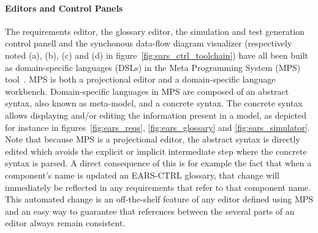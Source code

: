 \paragraph{\textbf{Editors and Control Panels}\\} 
\hspace{-.2cm}
The requirements editor, the glossary editor, the simulation and
test generation control panell and the synchonous data-flow diagram visualizer (respectively
noted (\textsf{a}), (\textsf{b}), (\textsf{c}) and (\textsf{d}) in figure~\ref{fig:ears_ctrl_toolchain}) have all been built as 
domain-specific languages (DSLs) in the Meta Programming System (MPS)
tool~\cite{mps}.
MPS is both a projectional editor and a domain-specific language workbench.
Domain-specific languages in MPS are composed of an abstract syntax, also known
as meta-model, and a concrete syntax. The concrete syntax allows displaying
and/or editing the information present in a model, as depicted for instance in
figures~\ref{fig:ears_reqs}, \ref{fig:ears_glossary} and
\ref{fig:ears_simulator}. Note that because MPS is a projectional editor, the
abstract syntax is directly edited which avoids the explicit or implicit
intermediate step where the concrete syntax is parsed.
A direct consequence of this is for example the fact that when a component's
name is updated an \textsf{EARS-CTRL} glossary, that change will immediately be
reflected in any requirements that refer to that component name. This automated
change is an off-the-shelf feature of any editor defined using MPS and an easy
way to guarantee that references between the several parts of an editor always
remain consistent.\vspace{-.2cm}
